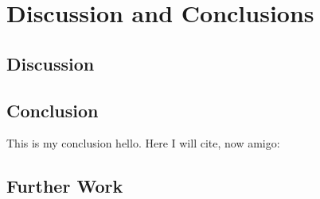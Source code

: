 
\chapter{Discussion and Conclusions}

\section{Discussion}

\section{Conclusion}

This is my conclusion hello. Here I will cite, now amigo: \cite{einstein}

\section{Further Work}
